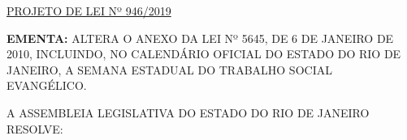 \documentclass[10pt]{article}
\date{}
\begin{document}
\maketitle
\begin{center}
  \huge
  \vspace{-3cm}\href{http://alerjln1.alerj.rj.gov.br/scpro1923.nsf/f4b46b3cdbba990083256cc900746cf6/6cfcb47c29cfb7838325844900506f8c?OpenDocument}{PROJETO DE LEI Nº 946/2019}
\bigskip
\bigskip
\bigskip
  
\end{center}

\textbf{EMENTA:} 
ALTERA O ANEXO DA LEI Nº 5645, DE 6 DE JANEIRO     DE 2010, INCLUINDO,      NO CALENDÁRIO OFICIAL DO ESTADO DO RIO DE JANEIRO, A SEMANA ESTADUAL DO TRABALHO SOCIAL EVANGÉLICO.








\bigskip

\noindent
A ASSEMBLEIA LEGISLATIVA DO ESTADO DO RIO DE JANEIRO RESOLVE:
\end{document}
